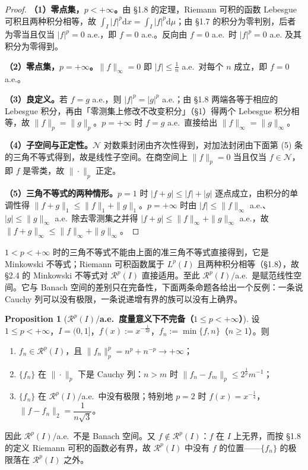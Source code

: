 \documentclass[oneside]{book}
\theoremstyle{definition}
\newcommand{\Rc}{\mathcal{R}}
\newcommand{\dd}{\mathrm{d}}
\theoremstyle{definition}
\newtheorem{proposition}{Proposition}[section]
\begin{document}
	\begin{proof}
		\textbf{（1）零点集，$p<+\infty$。}由 §1.8 的定理，Riemann 可积的函数 Lebesgue 可积且两种积分相等，故 $\int_I|f|^p\dd x=\int_I|f|^p\dd\mu$；由 §1.7 的积分为零判别，后者为零当且仅当 $|f|^p=0$ a.e.，即 $f=0$ a.e.。反向由 $f=0$ a.e.\ 时 $|f|^p=0$ a.e. 及其积分为零得到。
		
		\textbf{（2）零点集，$p=+\infty$。}$\|f\|_\infty=0$ 即 $|f|\leqslant\frac1n$ a.e.\ 对每个 $n$ 成立，即 $f=0$ a.e.。
		
		\textbf{（3）良定义。}若 $f=g$ a.e.，则 $|f|^p=|g|^p$ a.e.；由 §1.8 两端各等于相应的 Lebesgue 积分，再由「零测集上修改不改变积分」（§1）得两个 Lebesgue 积分相等，故 $\|f\|_p=\|g\|_p$。$p=+\infty$ 时 $f=g$ a.e.\ 直接给出 $\|f\|_\infty=\|g\|_\infty$。
		
		\textbf{（4）子空间与正定性。}$\mathcal N$ 对数乘封闭由齐次性得到，对加法封闭由下面第 (5) 条的三角不等式得到，故是线性子空间。在商空间上 $\|f\|_p=0$ 当且仅当 $f\in\mathcal N$，即 $f$ 是零类，故 $\|\cdot\|_p$ 正定。
		
		\textbf{（5）三角不等式的两种情形。}$p=1$ 时 $|f+g|\leqslant|f|+|g|$ 逐点成立，由积分的单调性得 $\|f+g\|_1\leqslant\|f\|_1+\|g\|_1$。$p=+\infty$ 时由 $|f|\leqslant\|f\|_\infty$ a.e.、$|g|\leqslant\|g\|_\infty$ a.e.\ 除去零测集之并得 $|f+g|\leqslant\|f\|_\infty+\|g\|_\infty$ a.e.，故 $\|f+g\|_\infty\leqslant\|f\|_\infty+\|g\|_\infty$。
	\end{proof}
	
	$1<p<+\infty$ 时的三角不等式不能由上面的准三角不等式直接得到，它是 Minkowski 不等式；Riemann 可积函数属于 $L^p(I)$ 且两种积分相等（§1.8），故 §2.4 的 Minkowski 不等式对 $\Rc^p(I)$ 直接适用。至此 $\Rc^p(I)/$a.e.\ 是赋范线性空间。它与 Banach 空间的差别只在完备性，下面两条命题各给出一个反例：一条说 Cauchy 列可以没有极限，一条说递增有界的族可以没有上确界。
	
	\begin{proposition}[\bfseries{$\Rc^p(I)/$a.e.\ 度量意义下不完备（$1\leqslant p<+\infty$）}]
		设 $1\leqslant p<+\infty$，$I=(0,1]$，$f(x):=x^{-\frac1{2p}}$，$f_n:=\min\{f,n\}$（$n\geqslant1$）。则
		\begin{enumerate}[leftmargin=2.4em]
			\item $f_n\in\Rc^p(I)$，且 $\|f_n\|_p^p=n^p+n^{-p}\to+\infty$；
			\item $\{f_n\}$ 在 $\|\cdot\|_p$ 下是 Cauchy 列：$n>m$ 时 $\|f_n-f_m\|_p\leqslant2^{\frac1p}m^{-1}$；
			\item $\{f_n\}$ 在 $\Rc^p(I)/$a.e.\ 中没有极限；特别地 $p=2$ 时 $f(x)=x^{-\frac14}$，$\|f-f_n\|_2=\dfrac1{n\sqrt3}$。
		\end{enumerate}
		因此 $\Rc^p(I)/$a.e.\ 不是 Banach 空间。又 $f\notin\Rc^p(I)$：$f$ 在 $I$ 上无界，而按 §1.8 的定义 Riemann 可积的函数必有界，故 $\Rc^p(I)$ 中没有 $f$ 的位置——$\{f_n\}$ 的极限落在 $\Rc^p(I)$ 之外。
	\end{proposition}
	
\end{document}
